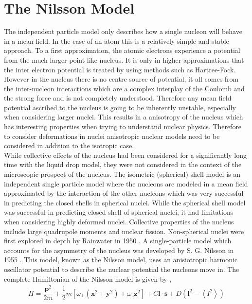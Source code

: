 \documentclass[10pt,a4paper, twoside, openright]{report}
\begin{document}
\section{The Nilsson Model}
  The independent particle model only describes how a single nucleon will behave in a mean field. In the case of an atom this is a relatively simple and stable approach. To a first approximation, the atomic electrons experience a potential from the much larger point like nucleus. It is only in higher approximations that  the inter electron potential is treated by using methods such as Hartree-Fock. However in the nucleus there is no centre source of potential, it all comes from the inter-nucleon interactions which are a complex interplay of the Coulomb and the strong force and is not completely understood. Therefore any mean field potential ascribed to the nucleus is going to be inherently unstable, especially when considering larger nuclei. This results in a anisotropy of the nucleus which has interesting properties when trying to understand nuclear physics. Therefore to consider deformations in nuclei anisotropic nuclear models need to be considered in addition to the isotropic case. \\
\linebreak
While collective effects of the nucleus had been considered for a significantly long time with the liquid drop model, they were not considered in the context of the microscopic prospect of the nucleus\cite{Brix1986}. The isometric (spherical) shell model is an independent single particle model where the nucleons are modeled in a mean field approximated by the interaction of the other nucleons which was very successful in predicting the closed shells in spherical nuclei\cite{Mayer1949, Jensen1949}. While the spherical shell model was successful in predicting closed shell of spherical nuclei, it had limitations when considering highly deformed nuclei. Collective properties of the nucleus include large quadrupole moments and nuclear fission. Non-spherical nuclei were first explored in depth by Rainwater in 1950 \cite{Rainwater1950}. A single-particle model which accounts for the asymmetry of the nucleus was developed by S. G. Nilsson in 1955 \cite{Nilsson1955}. This model, known as the Nilsson model, uses an anisiotropic harmonic oscillator potential to describe the nuclear potential the nucleons move in. The complete Hamiltonian of the Nilsson model is given by \cite{Nilsson1955, Gustafson1967},
\begin{align} \label{eq:NilssonHamiltonian}
H = \dfrac{\textbf{p}^2}{2m} + \dfrac{1}{2}m \left[\omega_{\perp}\left(\textbf{x}^2 + \textbf{y}^2\right) + \omega_z \textbf{z}^2\right] + C\textbf{l}\cdot \textbf{s} + D \left(\textbf{l}^2 - \left<I^2\right>\right)
\end{align}
\end{document}
